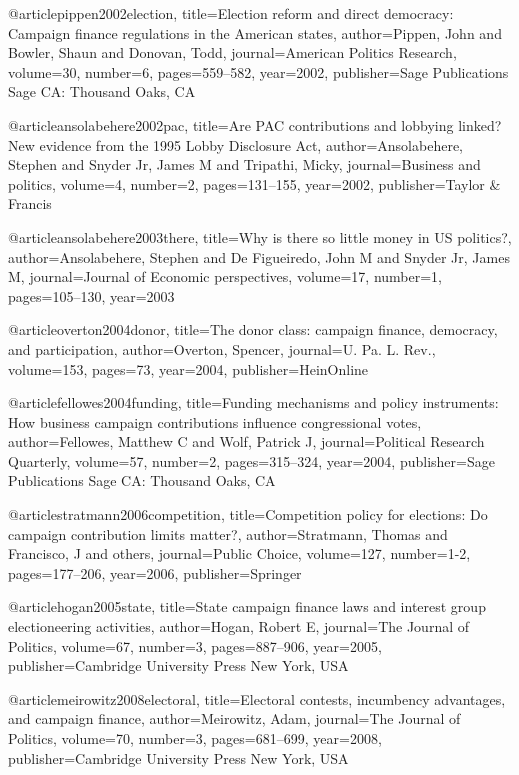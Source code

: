 @article{pippen2002election,
  title={Election reform and direct democracy: Campaign finance regulations in the American states},
  author={Pippen, John and Bowler, Shaun and Donovan, Todd},
  journal={American Politics Research},
  volume={30},
  number={6},
  pages={559--582},
  year={2002},
  publisher={Sage Publications Sage CA: Thousand Oaks, CA}
}

@article{ansolabehere2002pac,
  title={Are PAC contributions and lobbying linked? New evidence from the 1995 Lobby Disclosure Act},
  author={Ansolabehere, Stephen and Snyder Jr, James M and Tripathi, Micky},
  journal={Business and politics},
  volume={4},
  number={2},
  pages={131--155},
  year={2002},
  publisher={Taylor \& Francis}
}

@article{ansolabehere2003there,
  title={Why is there so little money in US politics?},
  author={Ansolabehere, Stephen and De Figueiredo, John M and Snyder Jr, James M},
  journal={Journal of Economic perspectives},
  volume={17},
  number={1},
  pages={105--130},
  year={2003}
}

@article{overton2004donor,
  title={The donor class: campaign finance, democracy, and participation},
  author={Overton, Spencer},
  journal={U. Pa. L. Rev.},
  volume={153},
  pages={73},
  year={2004},
  publisher={HeinOnline}
}

@article{fellowes2004funding,
  title={Funding mechanisms and policy instruments: How business campaign contributions influence congressional votes},
  author={Fellowes, Matthew C and Wolf, Patrick J},
  journal={Political Research Quarterly},
  volume={57},
  number={2},
  pages={315--324},
  year={2004},
  publisher={Sage Publications Sage CA: Thousand Oaks, CA}
}

@article{stratmann2006competition,
  title={Competition policy for elections: Do campaign contribution limits matter?},
  author={Stratmann, Thomas and Francisco, J and others},
  journal={Public Choice},
  volume={127},
  number={1-2},
  pages={177--206},
  year={2006},
  publisher={Springer}
}

@article{hogan2005state,
  title={State campaign finance laws and interest group electioneering activities},
  author={Hogan, Robert E},
  journal={The Journal of Politics},
  volume={67},
  number={3},
  pages={887--906},
  year={2005},
  publisher={Cambridge University Press New York, USA}
}

@article{meirowitz2008electoral,
  title={Electoral contests, incumbency advantages, and campaign finance},
  author={Meirowitz, Adam},
  journal={The Journal of Politics},
  volume={70},
  number={3},
  pages={681--699},
  year={2008},
  publisher={Cambridge University Press New York, USA}
}


